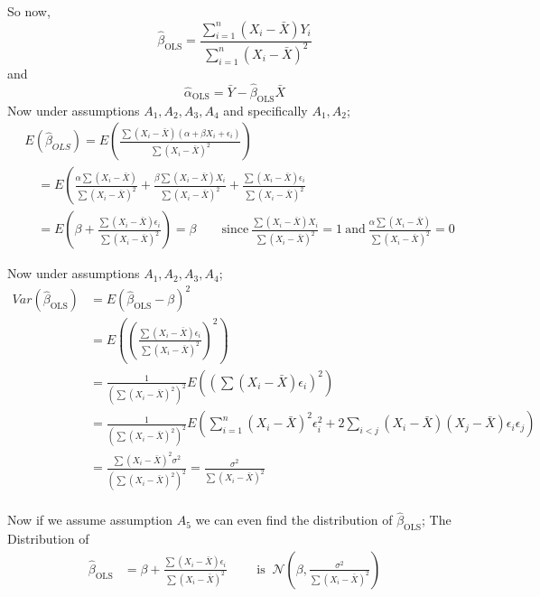 \documentclass[12pt,a4paper]{article}
\begin{document}
So now,
\begin{equation*}
    \hat{\beta}_{\text{OLS}}=\frac{\sum_{i=1}^{n}(X_{i}-\bar{X})Y_{i}}{\sum_{i=1}^{n}(X_{i}-\bar{X})^2}
\end{equation*}
and
\begin{equation*}
    \hat{\alpha}_{\text{OLS}}= \bar{Y}- \hat{\beta}_{\text{OLS}}\bar{X}
\end{equation*}     
Now under assumptions \(A_{1},A_{2},A_{3},A_{4}\) and specifically \(A_{1},A_{2}\);  
\begin{align*} 
    & E\left(\hat{\beta}_{OLS}\right)=E\left(\frac{\sum\left(X_i-\bar{X}\right)\left(\alpha+\beta X_i+\epsilon_i\right)}{\sum\left(X_i-\bar{X}\right)^2}\right) \\ 
    & \quad=E\left(\frac{\alpha \sum\left(X_i-\bar{X}\right)}{\sum\left(X_i-\bar{X}\right)^2}+\frac{\beta \sum\left(X_i-\bar{X}\right) X_i}{\sum\left(X_i-\bar{X}\right)^2}+\frac{\sum\left(X_i-\bar{X}\right) \epsilon_i}{\sum\left(X_i-\bar{X}\right)^2}\right. \\ 
    & \quad=E\left(\beta+\frac{\sum\left(X_i-\bar{X}\right) \epsilon_i}{\sum\left(X_i-\bar{X}\right)^2}\right)=\beta \qquad \text{since} \ \frac{\sum (X_{i}-\bar{X})X_{i}}{\sum (X_{i}-\bar{X})^2}=1 \ \text{and} \ \frac{\alpha\sum (X_{i}-\bar{X})}{\sum (X_{i}-\bar{X})^2}=0
\end{align*}
\pagebreak

Now under assumptions \(A_1,A_2,A_3,A_4\);
\begin{align*}
    Var(\hat{\beta}_{\text{OLS}})&= E(\hat{\beta}_{\text{OLS}}-\beta)^2\\
    &= E\left( \left(\frac{\sum (X_{i}-\bar{X})\epsilon_{i}}{\sum(X_{i}-\bar{X})^2} \right)^2 \right)\\
    &=\frac{1}{\left( \sum (X_{i}-\bar{X})^2 \right)^2 }E\left( \left( \sum (X_{i} -\bar{X})\epsilon_{i} \right)^2  \right) \\
    &=\frac{1}{\left( \sum (X_{i}-\bar{X})^2 \right)^2 } E\left( \sum_{i=1}^n (X_{i}-\bar{X})^2\epsilon_{i}^2 +2\sum_{i<j}(X_{i}-\bar{X})(X_{j}- \bar{X} )\epsilon_{i}\epsilon_{j}  \right) \\
    &= \frac{\sum (X_{i}-\bar{X})^2\sigma^2}{\left( \sum \left( X_{i}-\bar{X} \right)^2  \right)^2 }= \frac{\sigma^2}{\sum (X_{i}-\bar{X})^2}\\
\end{align*}

Now if we assume assumption \(A_5\) we can even find the distribution of \(\hat{\beta}_{\text{OLS}}\);
The Distribution of 
 \begin{align*}
    \hat{\beta}_{\text{OLS}}&= \beta + \frac{\sum (X_{i}-\bar{X})\epsilon_{i}}{\sum (X_{i}- \bar{X} )^2 } \qquad \text{ is }  \ \mathcal{N}\left( \beta,\frac{\sigma^2}{\sum (X_{i}-\bar{X})^2}  \right) 
\end{align*}
\pagebreak
\end{document}
